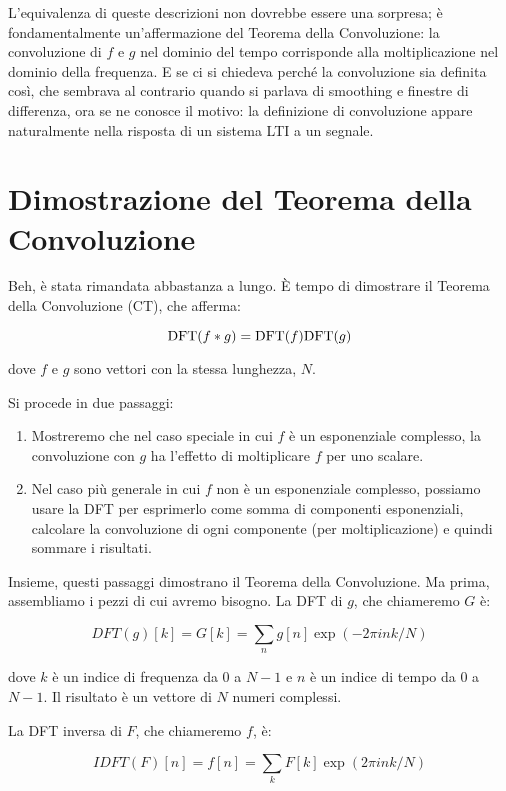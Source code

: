 \documentclass[12pt,a4paper]{book}
\begin{document}
L'equivalenza di queste descrizioni non dovrebbe essere una sorpresa; è fondamentalmente un'affermazione del Teorema della Convoluzione: la convoluzione di $f$ e $g$ nel dominio del tempo corrisponde alla moltiplicazione nel dominio della frequenza. E se ci si chiedeva perché la convoluzione sia definita così, che sembrava al contrario quando si parlava di smoothing e finestre di differenza, ora se ne conosce il motivo: la definizione di convoluzione appare naturalmente nella risposta di un sistema LTI a un segnale.

\section{Dimostrazione del Teorema della Convoluzione} 

Beh, è stata rimandata abbastanza a lungo. È tempo di dimostrare il Teorema della Convoluzione (CT), che afferma:

\[ \mathrm{DFT}(f \ast g) = \mathrm{DFT}(f) \mathrm{DFT}(g) \] 

dove $f$ e $g$ sono vettori con la stessa lunghezza, $N$.

Si procede in due passaggi:

\begin{enumerate} 

\item Mostreremo che nel caso speciale in cui $f$ è un esponenziale complesso, la convoluzione con $g$ ha l'effetto di moltiplicare $f$ per uno scalare.

\item Nel caso più generale in cui $f$ non è un esponenziale complesso, possiamo usare la DFT per esprimerlo come somma di componenti esponenziali, calcolare la convoluzione di ogni componente (per moltiplicazione) e quindi sommare i risultati.

\end{enumerate} 

Insieme, questi passaggi dimostrano il Teorema della Convoluzione. Ma prima, assembliamo i pezzi di cui avremo bisogno. La DFT di $g$, che chiameremo $G$ è:

%
\[ DFT(g)[k] = G[k] = \sum_n g[n] \exp(-2 \pi i n k / N) \] 

%
dove $k$ è un indice di frequenza da 0 a $N-1$ e $n$ è un indice di tempo da 0 a $N-1$. Il risultato è un vettore di $N$ numeri complessi.

La DFT inversa di $F$, che chiameremo $f$, è:

%
\[ IDFT(F)[n] = f[n] = \sum_k F[k] \exp(2 \pi i n k / N) \] 
\end{document}
